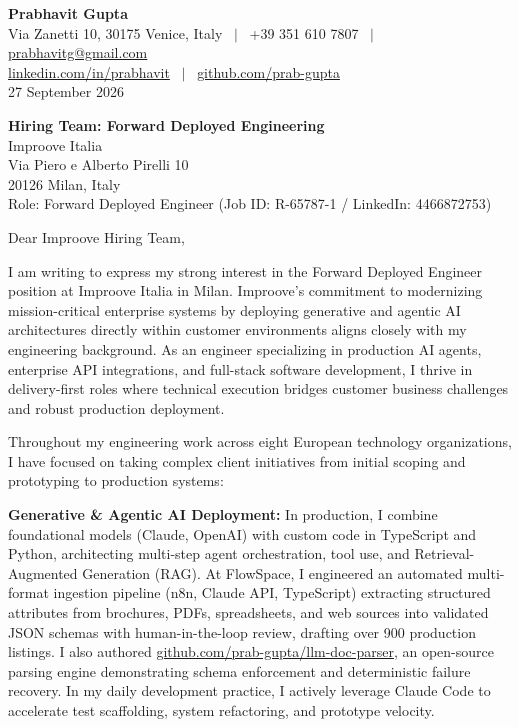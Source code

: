 \documentclass[10.5pt,a4paper]{article}
\begin{document}
\textbf{\large Prabhavit Gupta}\\
Via Zanetti 10, 30175 Venice, Italy ~$\vert$~ +39 351 610 7807 ~$\vert$~ \href{mailto:prabhavitg@gmail.com}{prabhavitg@gmail.com}\\
\href{https://www.linkedin.com/in/prabhavit/}{linkedin.com/in/prabhavit} ~$\vert$~ \href{https://github.com/prab-gupta}{github.com/prab-gupta}\\
27 September 2026

\textbf{Hiring Team: Forward Deployed Engineering}\\
Improove Italia\\
Via Piero e Alberto Pirelli 10\\
20126 Milan, Italy\\
Role: Forward Deployed Engineer (Job ID: R-65787-1 / LinkedIn: 4466872753)

Dear Improove Hiring Team,

I am writing to express my strong interest in the Forward Deployed Engineer position at Improove Italia in Milan. Improove's commitment to modernizing mission-critical enterprise systems by deploying generative and agentic AI architectures directly within customer environments aligns closely with my engineering background. As an engineer specializing in production AI agents, enterprise API integrations, and full-stack software development, I thrive in delivery-first roles where technical execution bridges customer business challenges and robust production deployment.

Throughout my engineering work across eight European technology organizations, I have focused on taking complex client initiatives from initial scoping and prototyping to production systems:

\textbf{Generative \& Agentic AI Deployment:} In production, I combine foundational models (Claude, OpenAI) with custom code in TypeScript and Python, architecting multi-step agent orchestration, tool use, and Retrieval-Augmented Generation (RAG). At FlowSpace, I engineered an automated multi-format ingestion pipeline (n8n, Claude API, TypeScript) extracting structured attributes from brochures, PDFs, spreadsheets, and web sources into validated JSON schemas with human-in-the-loop review, drafting over 900 production listings. I also authored \href{https://github.com/prab-gupta/llm-doc-parser}{github.com/prab-gupta/llm-doc-parser}, an open-source parsing engine demonstrating schema enforcement and deterministic failure recovery. In my daily development practice, I actively leverage Claude Code to accelerate test scaffolding, system refactoring, and prototype velocity.
\end{document}
